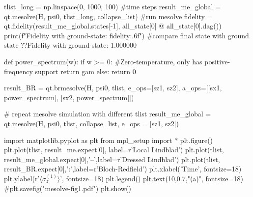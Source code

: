 tlist_long = np.linspace(0, 1000, 100) #time steps
result_me_global = qt.mesolve(H, psi0, tlist_long, collapse_list) #run mesolve 
fidelity = qt.fidelity(result_me_global.states[-1], all_state[0] @ all_state[0].dag())
print(f"Fidelity with ground-state: {fidelity:.6f}") #compare final state with ground state
?\pythonoutput?Fidelity with ground-state: 1.000000




def power_spectrum(w):
    if w >= 0: #Zero-temperature, only has positive-frequency support
        return gam
    else:
        return 0

result_BR = qt.brmesolve(H, psi0, tlist, e_ops=[sz1, sz2],
                         a_ops=[[sx1, power_spectrum], [sx2, power_spectrum]])

# repeat mesolve simulation with different tlist
result_me_global = qt.mesolve(H, psi0, tlist, collapse_list, e_ops = [sz1, sz2])

import matplotlib.pyplot as plt
from mpl_setup import * 
plt.figure()
plt.plot(tlist, result_me.expect[0], label=r'Local Lindblad')
plt.plot(tlist, result_me_global.expect[0],'--',label=r'Dressed Lindblad')
plt.plot(tlist, result_BR.expect[0],':',label=r'Bloch-Redfield')
plt.xlabel('Time', fontsize=18)
plt.ylabel(r'$\langle \sigma_z^{(1)} \rangle$', fontsize=18)
plt.legend()
plt.text(10,0.7,"(a)", fontsize=18)
#plt.savefig("mesolve-fig1.pdf")
plt.show()
